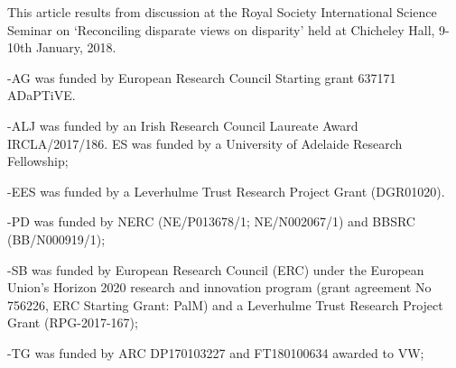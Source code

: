 \documentclass[12pt,letterpaper]{article}
\begin{document}
This article results from discussion at the Royal Society International Science Seminar on `Reconciling disparate views on disparity' held at Chicheley Hall, 9-10th January, 2018.

-AG was funded by European Research Council Starting grant 637171 ADaPTiVE.

-ALJ was funded by an Irish Research Council Laureate Award IRCLA/2017/186. ES was funded by a University of Adelaide Research Fellowship;

-EES was funded by a Leverhulme Trust Research Project Grant (DGR01020).

-PD was funded by NERC (NE/P013678/1; NE/N002067/1) and BBSRC (BB/N000919/1);

-SB was funded by European Research Council (ERC) under the European Union's Horizon 2020 research and innovation program (grant agreement No 756226, ERC Starting Grant: PalM) and a Leverhulme Trust Research Project Grant (RPG-2017-167);

-TG was funded by ARC DP170103227 and FT180100634 awarded to VW;
\end{document}
